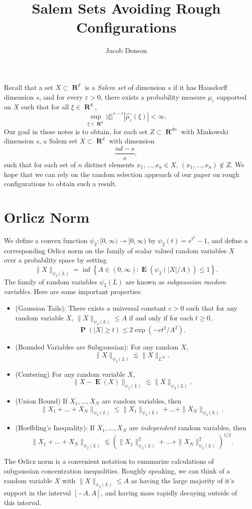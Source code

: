 \documentclass[12pt,reqno]{amsart}
\title{Salem Sets Avoiding Rough Configurations}
\author{Jacob Denson}
\DeclareMathOperator{\RR}{\mathbf{R}}
\DeclareMathOperator{\EE}{\mathbf{E}}
\DeclareMathOperator{\PP}{\mathbf{P}}
\newcommand{\psitwo}[1]{\| {#1} \|_{\psi_2(L)}}
\begin{document}
\maketitle

Recall that a set $X \subset \RR^d$ is a \emph{Salem set} of dimension $s$ if it has Hausdorff dimension $s$, and for every $\varepsilon > 0$, there exists a probability measure $\mu_\varepsilon$ supported on $X$ such that for all $\xi \in \RR^d$,
%
\[ \sup_{\xi \in \RR^d} |\xi|^{s - \varepsilon} |\widehat{\mu_\varepsilon}(\xi)| < \infty. \]
%
Our goal in these notes is to obtain, for each set $Z \subset \RR^{dn}$ with Minkowski dimension $s$, a Salem set $X \subset \RR^d$ with dimension
%
\[ \frac{nd - s}{s}, \]
%
such that for each set of $n$ distinct elements $x_1, \dots, x_n \in X$, $(x_1, \dots, x_n) \not \in Z$. We hope that we can rely on the random selection approach of our paper on rough configurations to obtain such a result.

\section{Orlicz Norm}

We define a convex function $\psi_2: [0,\infty) \to [0,\infty)$ by $\psi_2(t) = e^{t^2} - 1$, and define a corresponding Orlicz norm on the family of scalar valued random variables $X$ over a probability space by setting
%
\[ \psitwo{X} = \inf \left\{ A \in (0,\infty) : \EE(\psi_2(|X|/A)) \leq 1 \right\}. \]
%
The family of random variables $\psi_2(L)$ are known as \emph{subgaussian random variables}. Here are some important properties:
%
\begin{itemize}
	\item (Gaussian Tails): There exists a universal constant $c > 0$ such that for any random variable $X$, $\psitwo{X} \leq A$ if and only if for each $t \geq 0$,
	\[ \PP \left( |X| \geq t \right) \leq 2 \exp \left( -ct^2/A^2 \right). \]

	\item (Bounded Variables are Subgaussian): For any random $X$,
	\[ \psitwo{X} \lesssim \| X \|_{L^\infty}. \]

	\item (Centering) For any random variable $X$,
	\[ \psitwo{X - \EE(X)} \lesssim \psitwo{X}. \]
	
	\item (Union Bound) If $X_1, \dots, X_N$ are random variables, then
	\[ \psitwo{X_1 + \dots + X_N} \leq \psitwo{X_1} + \dots + \psitwo{X_N}. \]
	
	\item (Hoeffding's Inequality): If $X_1, \dots, X_N$ are \emph{independent} random variables, then
	\[ \psitwo{X_1 + \dots + X_N} \lesssim \left( \psitwo{X_1}^2 + \dots + \psitwo{X_N}^2 \right)^{1/2}. \]
\end{itemize}
%
The Orlicz norm is a convenient notation to summarize calculations of subgaussian concentration inequalities. Roughly speaking, we can think of a random variable $X$ with $\psitwo{X} \leq A$ as having the large majority of it's support in the interval $[-A,A]$, and having mass rapidly decaying outside of this interval.
\end{document}

